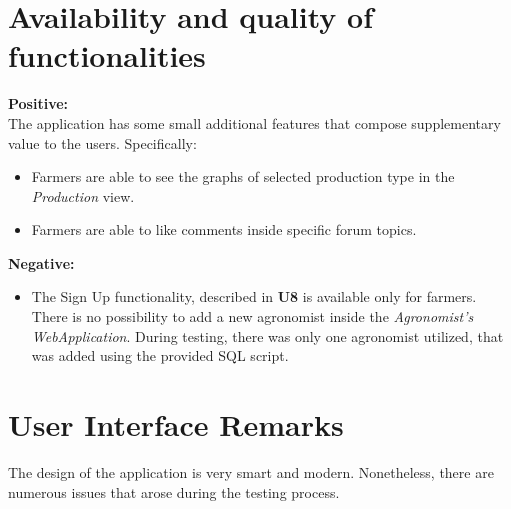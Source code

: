 \section{Availability and quality of functionalities}

\textbf{Positive:}\\
The application has some small additional features that compose supplementary value to the users. Specifically:
\begin{itemize}
    \item Farmers are able to see the graphs of selected production type in the \textit{Production} view.
    \item Farmers are able to like comments inside specific forum topics.
\end{itemize}

\textbf{Negative:}
\begin{itemize}
    \item The Sign Up functionality, described in \textbf{U8} is available only for farmers. There is no possibility to add a new agronomist inside the \textit{Agronomist's WebApplication}. During testing, there was only one agronomist utilized, that was added using the provided SQL script.
\end{itemize}

\section{User Interface Remarks}

The design of the application is very smart and modern. Nonetheless, there are numerous issues that arose during the testing process.

